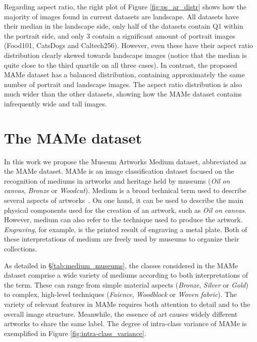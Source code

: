 \documentclass{article}
\begin{document}
Regarding aspect ratio, the right plot of Figure \ref{fig:ps_ar_distr} shows how the majority of images found in current datasets are landscape. All datasets have their median in the landscape side, only half of the datasets contain Q1 within the portrait side, and only 3 contain a significant amount of portrait images (Food101, CatsDogs and Caltech256). However, even these have their aspect ratio distribution clearly skewed towards landscape images (notice that the median is quite close to the third quartile on all three cases). In contrast, the proposed MAMe dataset has a balanced distribution, containing approximately the same number of portrait and landscape images. The aspect ratio distribution is also much wider than the other datasets, showing how the MAMe dataset contains infrequently wide and tall images.

\section{The MAMe dataset}\label{sec:mame_dataset}

In this work we propose the Museum Artworks Medium dataset, abbreviated as the MAMe dataset. MAMe is an image classification dataset focused on the recognition of mediums in artworks and heritage held by museums (\eg \textit{Oil on canvas}, \textit{Bronze} or \textit{Woodcut}). Medium is a broad technical term used to describe several aspects of artworks~\citep{maynor1989paper}. On one hand, it can be used to describe the main physical components used for the creation of an artwork, such as \textit{Oil on canvas}. However, medium can also refer to the technique used to produce the artwork. \textit{Engraving}, for example, is the printed result of engraving a metal plate. Both of these interpretations of medium are freely used by museums to organize their collections.

As detailed in \S\ref{tab:medium_museums}, the classes considered in the MAMe dataset comprise a wide variety of mediums according to both interpretations of the term. These can range from simple material aspects (\eg \textit{Bronze}, \textit{Silver} or \textit{Gold}) to complex, high-level techniques (\eg \textit{Faience}, \textit{Woodblock} or \textit{Woven fabric}). The variety of relevant features in MAMe requires both attention to detail and to the overall image structure. Meanwhile, the essence of art causes widely different artworks to share the same label. The degree of intra-class variance of MAMe is exemplified in Figure \ref{fig:intra-class_variance}.
\end{document}
